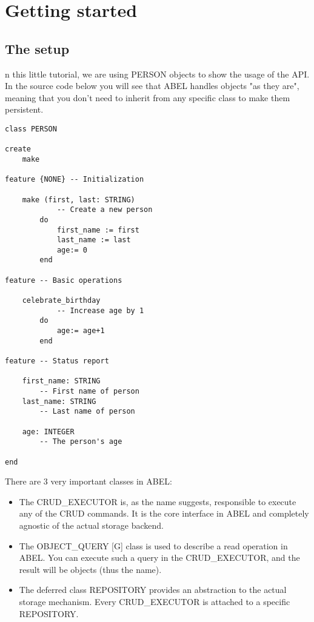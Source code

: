 
\section{Getting started}

\subsection{The setup}
n this little tutorial, we are using PERSON objects to show the usage of the API.
In the source code below you will see that ABEL handles objects "as they are", meaning that you don't need to inherit from any specific class to make them persistent.

\begin{lstlisting}[language=OOSC2Eiffel, captionpos=b, caption={The PERSON class}, label={lst:person_class}]
class PERSON

create
	make

feature {NONE} -- Initialization

	make (first, last: STRING)
			-- Create a new person
		do
			first_name := first
			last_name := last
			age:= 0
		end

feature -- Basic operations

	celebrate_birthday
			-- Increase age by 1
		do
			age:= age+1
		end

feature -- Status report

	first_name: STRING
		-- First name of person
	last_name: STRING
		-- Last name of person

	age: INTEGER
		-- The person's age

end

\end{lstlisting}




There are 3 very important classes in ABEL:
\begin{itemize}
 \item The CRUD\_EXECUTOR is, as the name suggests, responsible to execute any of the CRUD commands.
	It is the core interface in ABEL and completely agnostic of the actual storage backend.

 \item The OBJECT\_QUERY [G] class is used to describe a read operation in ABEL. You can execute such a query in the CRUD\_EXECUTOR, and the result will be objects (thus the name).

 \item The deferred class REPOSITORY provides an abstraction to the actual storage mechanism.
	Every CRUD\_EXECUTOR is attached to a specific REPOSITORY.
\end{itemize}

